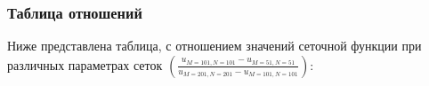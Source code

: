 \documentclass[a4paper,12pt]{article}
\begin{document}
\subsubsection*{Таблица отношений}
Ниже представлена таблица, с отношением значений сеточной функции при различных параметрах сеток \(\left(\frac{u_{M=101,N=101}-u_{M=51,N=51}}{u_{M=201,N=201}-u_{M=101,N=101}}\right)\):


\end{document}
